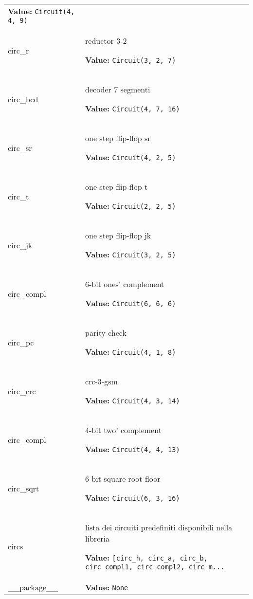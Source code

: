 \begin{longtable}{|p{\varnamewidth}|p{\vardescrwidth}|l}
\textbf{Value:} 
{\tt Circuit(4, 4, 9)}&\\
\cline{1-2}
\raggedright c\-i\-r\-c\-\_\-r\-3\-2\- & \raggedright reductor 3-2

\textbf{Value:} 
{\tt Circuit(3, 2, 7)}&\\
\cline{1-2}
\raggedright c\-i\-r\-c\-\_\-b\-c\-d\- & \raggedright decoder 7 segmenti

\textbf{Value:} 
{\tt Circuit(4, 7, 16)}&\\
\cline{1-2}
\raggedright c\-i\-r\-c\-\_\-s\-r\- & \raggedright one step flip-flop sr

\textbf{Value:} 
{\tt Circuit(4, 2, 5)}&\\
\cline{1-2}
\raggedright c\-i\-r\-c\-\_\-t\- & \raggedright one step flip-flop t

\textbf{Value:} 
{\tt Circuit(2, 2, 5)}&\\
\cline{1-2}
\raggedright c\-i\-r\-c\-\_\-j\-k\- & \raggedright one step flip-flop jk

\textbf{Value:} 
{\tt Circuit(3, 2, 5)}&\\
\cline{1-2}
\raggedright c\-i\-r\-c\-\_\-c\-o\-m\-p\-l\-1\- & \raggedright 6-bit ones' complement

\textbf{Value:} 
{\tt Circuit(6, 6, 6)}&\\
\cline{1-2}
\raggedright c\-i\-r\-c\-\_\-p\-c\- & \raggedright parity check

\textbf{Value:} 
{\tt Circuit(4, 1, 8)}&\\
\cline{1-2}
\raggedright c\-i\-r\-c\-\_\-c\-r\-c\-3\- & \raggedright crc-3-gsm

\textbf{Value:} 
{\tt Circuit(4, 3, 14)}&\\
\cline{1-2}
\raggedright c\-i\-r\-c\-\_\-c\-o\-m\-p\-l\-2\- & \raggedright 4-bit two' complement

\textbf{Value:} 
{\tt Circuit(4, 4, 13)}&\\
\cline{1-2}
\raggedright c\-i\-r\-c\-\_\-s\-q\-r\-t\- & \raggedright 6 bit square root floor

\textbf{Value:} 
{\tt Circuit(6, 3, 16)}&\\
\cline{1-2}
\raggedright c\-i\-r\-c\-s\- & \raggedright lista dei circuiti predefiniti disponibili nella libreria

\textbf{Value:} 
{\tt [circ\_h, circ\_a, circ\_b, circ\_compl1, circ\_compl2, circ\_m\texttt{...}}&\\
\cline{1-2}
\raggedright \_\-\_\-p\-a\-c\-k\-a\-g\-e\-\_\-\_\- & \raggedright \textbf{Value:} 
{\tt None}&\\
\cline{1-2}
\end{longtable}



